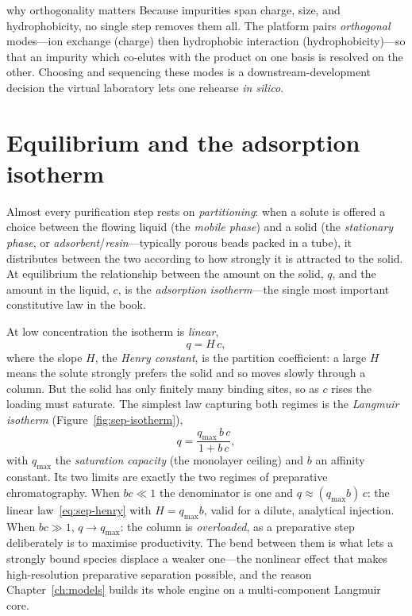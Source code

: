 \begin{appbox}{why orthogonality matters}
Because impurities span charge, size, and hydrophobicity, no single step removes
them all. The platform pairs \emph{orthogonal} modes---ion exchange (charge) then
hydrophobic interaction (hydrophobicity)---so that an impurity which co-elutes
with the product on one basis is resolved on the other. Choosing and sequencing
these modes is a downstream-development decision the virtual laboratory lets one
rehearse \emph{in silico}.
\end{appbox}

\section{Equilibrium and the adsorption isotherm}
\label{sec:sep-isotherm}

Almost every purification step rests on \emph{partitioning}: when a solute is
offered a choice between the flowing liquid (the \emph{mobile phase}) and a solid
(the \emph{stationary phase}, or \emph{adsorbent}/\emph{resin}---typically porous
beads packed in a tube), it distributes between the two according to how strongly
it is attracted to the solid. At equilibrium the relationship between the amount
on the solid, $q$, and the amount in the liquid, $c$, is the \emph{adsorption
isotherm}---the single most important constitutive law in the book.

At low concentration the isotherm is \emph{linear},
%
\begin{equation}
q = H\,c,
\label{eq:sep-henry}
\end{equation}
%
where the slope $H$, the \emph{Henry constant}, is the partition coefficient: a
large $H$ means the solute strongly prefers the solid and so moves slowly through
a column. But the solid has only finitely many binding sites, so as $c$ rises the
loading must saturate. The simplest law capturing both regimes is the
\emph{Langmuir isotherm} (Figure~\ref{fig:sep-isotherm}),
%
\begin{equation}
q = \frac{q_{\max}\,b\,c}{1 + b\,c},
\label{eq:sep-langmuir}
\end{equation}
%
with $q_{\max}$ the \emph{saturation capacity} (the monolayer ceiling) and $b$ an
affinity constant. Its two limits are exactly the two regimes of preparative
chromatography. When $bc\ll1$ the denominator is one and $q\approx(q_{\max}b)\,c$:
the linear law~\eqref{eq:sep-henry} with $H=q_{\max}b$, valid for a dilute,
analytical injection. When $bc\gg1$, $q\to q_{\max}$: the column is
\emph{overloaded}, as a preparative step deliberately is to maximise
productivity. The bend between them is what lets a strongly bound species
displace a weaker one---the nonlinear effect that makes high-resolution
preparative separation possible, and the reason Chapter~\ref{ch:models} builds
its whole engine on a multi-component Langmuir core.

